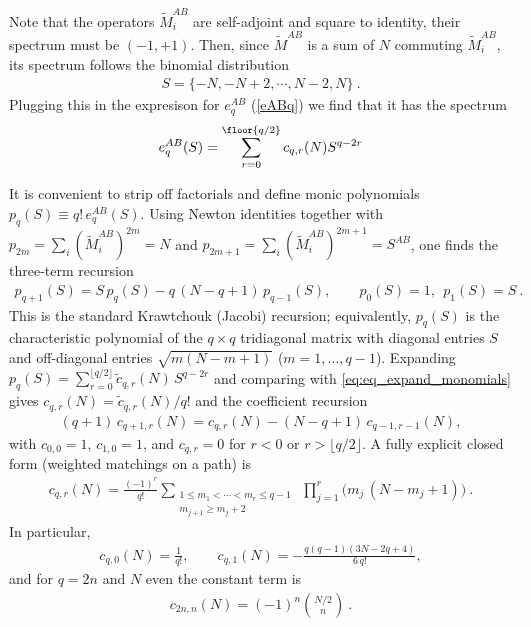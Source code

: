 \documentclass{article}
\theoremstyle{definition}
\begin{document}
    Note that the operators $\tilde{M}_{i}^{AB}$ are self-adjoint and square to identity,
    their spectrum must be $(-1,+1)$. Then, since $\tilde{M}^{AB}$ is a sum of
    $N$ commuting $\tilde{M}_{i}^{AB}$, its spectrum follows the binomial distribution
    \begin{eqnarray}
        S=\{-N,-N+2,\cdots , N-2,N\}\ .
    \end{eqnarray}
    Plugging this in the expresison for $e^{AB}_{q}$ (\ref{eABq}) we find that it
    has the spectrum
    \begin{eqnarray}
        e^{AB}_q(S)=\sum_{r=0}^{\floor{q/2}}c_{q,r}(N)S^{q-2r}
    \end{eqnarray}

    It is convenient to strip off factorials and define monic polynomials
    $p_{q}( S)\equiv q!\,e_{q}^{AB}(S)$. Using Newton identities together with $p
    _{2m}=\sum_{i}(\tilde M_{i}^{AB})^{2m}=N$ and $p_{2m+1}=\sum_{i}(\tilde M_{i}
    ^{AB})^{2m+1}=S^{AB}$, one finds the three-term recursion
    \begin{eqnarray}
        \label{eq:krawtchouk_recursion} p_{q+1}(S)=S\,p_q(S)-q\,(N-q+1)\,p_{q-1}(S),\qquad
        p_0(S)=1,\ \ p_1(S)=S\ .
    \end{eqnarray}
    This is the standard Krawtchouk (Jacobi) recursion; equivalently, $p_{q}(S)$
    is the characteristic polynomial of the $q\times q$ tridiagonal matrix with
    diagonal entries $S$ and off-diagonal entries $\sqrt{m(N-m+1)}$ ($m=1,\dots,q
    -1$). Expanding $p_{q}(S)=\sum_{r=0}^{\lfloor q/2\rfloor}\tilde c_{q,r}(N)\,S
    ^{q-2r}$ and comparing with \eqref{eq:eq_expand_monomials} gives
    $c_{q,r}(N)=\tilde c_{q,r}(N)/q!$ and the coefficient recursion
    \begin{eqnarray}
        \label{eq:cqr_recursion} (q+1)\,c_{q+1,r}(N)=c_{q,r}(N)-(N-q+1)\,c_{q-1,r-1}(N),
    \end{eqnarray}
    with $c_{0,0}=1$, $c_{1,0}=1$, and $c_{q,r}=0$ for $r<0$ or
    $r>\lfloor q/2\rfloor$. A fully explicit closed form (weighted matchings on
    a path) is
    \begin{eqnarray}
        \label{eq:cqr_matching} c_{q,r}(N)=\frac{(-1)^{r}}{q!} \!\!\!\sum_{\substack{1\le m_1<\cdots<m_r\le q-1\\ m_{j+1}\ge m_j+2}}
        \ \prod_{j=1}^{r} \Big(m_j\,(N-m_j+1)\Big)\ .
    \end{eqnarray}
    In particular,
    \begin{eqnarray}
        c_{q,0}(N)=\frac{1}{q!},\qquad c_{q,1}(N)=-\frac{q(q-1)(3N-2q+4)}{6\,q!},
    \end{eqnarray}
    and for $q=2n$ and $N$ even the constant term is
    \begin{eqnarray}
        c_{2n,n}(N)=(-1)^n\binom{N/2}{n}\ .
    \end{eqnarray}
\end{document}
